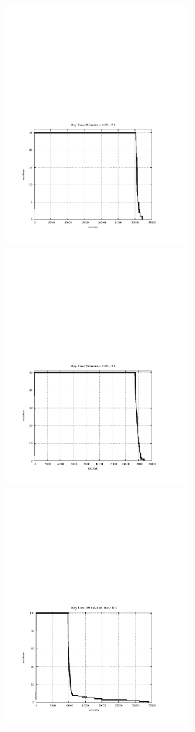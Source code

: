 \documentclass{l4proj}
\begin{document}
\begin{figure}
\vspace{-3.5cm}
\begin{center}
\hspace{-1.5cm}
\begin{minipage}[t]{0.3\textwidth}
\includegraphics[height=9.0cm]{busy-run25-frb35-17-1.pdf}
\end{minipage}
\hfill
\begin{minipage}[t]{0.3\textwidth}
\includegraphics[height=9.0cm]{busy-run50-frb35-17-1.pdf}
\end{minipage}
\hfill
\begin{minipage}[t]{0.3\textwidth}
\includegraphics[height=9.0cm]{busy-run100-frb35-17-1.pdf}

\end{minipage}
\end{center}
\end{figure}
\end{document}
